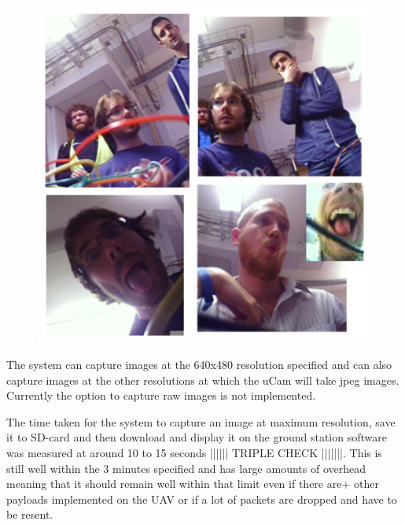 \begin{figure}[H]
        \centering
        \includegraphics[width=1.00\textwidth]{figures/SampleImages1.png}
        \label{fig:Samples1}
\end{figure}

The system can capture images at the 640x480 resolution specified and can also capture images at the other resolutions at which the uCam will take jpeg images. Currently the option to capture raw images is not implemented.

The time taken for the system to capture an image at maximum resolution, save it to SD-card and then download and display it on the ground station software was measured at around 10 to 15 seconds |||||| TRIPLE CHECK |||||||. This is still well within the 3 minutes specified and has large amounts of overhead meaning that it should remain well within that limit even if there are+ other payloads implemented on the UAV or if a lot of packets are dropped and have to be resent.